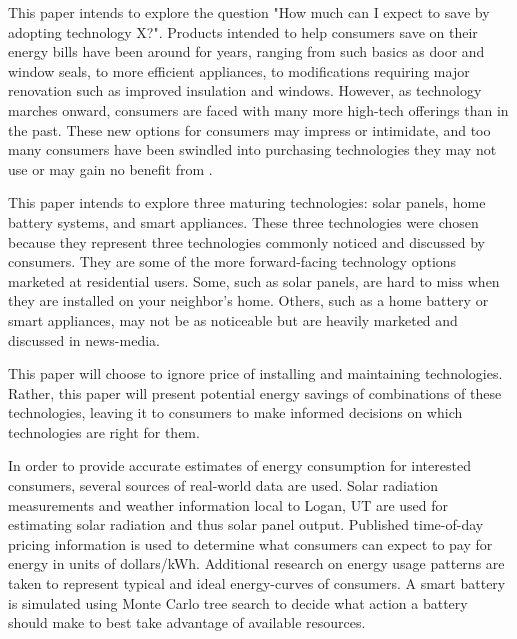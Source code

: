 This paper intends to explore the question "How much can I expect to save by adopting technology X?". Products intended to help consumers save on their energy bills have been around for years, ranging from such basics as door and window seals, to more efficient appliances, to modifications requiring major renovation such as improved insulation and windows. However, as technology marches onward, consumers are faced with many more high-tech offerings than in the past. These new options for consumers may impress or intimidate, and too many consumers have been swindled into purchasing technologies they may not use or may gain no benefit from \cite{obrien_think_nodate}.

This paper intends to explore three maturing technologies: solar panels, home battery systems, and smart appliances. These three technologies were chosen because they represent three technologies commonly noticed and discussed by consumers. They are some of the more forward-facing technology options marketed at residential users. Some, such as solar panels, are hard to miss when they are installed on your neighbor's home. Others, such as a home battery or smart appliances, may not be as noticeable but are heavily marketed and discussed in news-media.

This paper will choose to ignore price of installing and maintaining technologies. Rather, this paper will present potential energy savings of combinations of these technologies, leaving it to consumers to make informed decisions on which technologies are right for them.

In order to provide accurate estimates of energy consumption for interested consumers, several sources of real-world data are used. Solar radiation measurements and weather information local to Logan, UT \cite{noauthor_utah_nodate} are used for estimating solar radiation and thus solar panel output. Published time-of-day pricing information is used to determine what consumers can expect to pay for energy in units of dollars/kWh. Additional research on energy usage patterns are taken to represent typical and ideal energy-curves of consumers. A smart battery is simulated using Monte Carlo tree search to decide what action a battery should make to best take advantage of available resources.